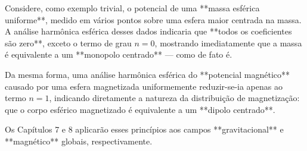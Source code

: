 Considere, como exemplo trivial, o potencial de uma **massa esférica uniforme**, medido em vários pontos sobre uma esfera maior centrada na massa. A análise harmônica esférica desses dados indicaria que **todos os coeficientes são zero**, exceto o termo de grau $n = 0$, mostrando imediatamente que a massa é equivalente a um **monopolo centrado** — como de fato é.

Da mesma forma, uma análise harmônica esférica do **potencial magnético** causado por uma esfera magnetizada uniformemente reduzir-se-ia apenas ao termo $n = 1$, indicando diretamente a natureza da distribuição de magnetização: que o corpo esférico magnetizado é equivalente a um **dipolo centrado**.

Os Capítulos 7 e 8 aplicarão esses princípios aos campos **gravitacional** e **magnético** globais, respectivamente.

























